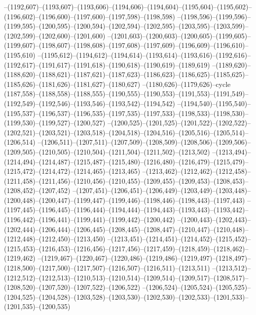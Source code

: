 --(1192,607)--(1193,607)--(1193,606)--(1194,606)--(1194,604)--(1195,604)--(1195,602)--(1196,602)--(1196,600)--(1197,600)--(1197,598)--(1198,598)
--(1198,596)--(1199,596)--(1199,595)--(1200,595)--(1200,594)--(1202,594)--(1202,595)--(1203,595)--(1203,599)--(1202,599)--(1202,600)--(1201,600)
--(1201,603)--(1200,603)--(1200,605)--(1199,605)--(1199,607)--(1198,607)--(1198,608)--(1197,608)--(1197,609)--(1196,609)--(1196,610)--(1195,610)
--(1195,612)--(1194,612)--(1194,614)--(1193,614)--(1193,616)--(1192,616)--(1192,617)--(1191,617)--(1191,618)--(1190,618)--(1190,619)--(1189,619)
--(1189,620)--(1188,620)--(1188,621)--(1187,621)--(1187,623)--(1186,623)--(1186,625)--(1185,625)--(1185,626)--(1181,626)--(1181,627)--(1180,627)
--(1180,626)--(1179,626)--cycle
(1187,558)--(1188,558)--(1188,555)--(1190,555)--(1190,553)--(1191,553)--(1191,549)--(1192,549)--(1192,546)--(1193,546)--(1193,542)--(1194,542)
--(1194,540)--(1195,540)--(1195,537)--(1196,537)--(1196,535)--(1197,535)--(1197,533)--(1198,533)--(1198,530)--(1199,530)--(1199,527)--(1200,527)
--(1200,525)--(1201,525)--(1201,522)--(1202,522)--(1202,521)--(1203,521)--(1203,518)--(1204,518)--(1204,516)--(1205,516)--(1205,514)--(1206,514)
--(1206,511)--(1207,511)--(1207,509)--(1208,509)--(1208,506)--(1209,506)--(1209,505)--(1210,505)--(1210,504)--(1211,504)--(1211,502)--(1213,502)
--(1213,494)--(1214,494)--(1214,487)--(1215,487)--(1215,480)--(1216,480)--(1216,479)--(1215,479)--(1215,472)--(1214,472)--(1214,465)--(1213,465)
--(1213,462)--(1212,462)--(1212,458)--(1211,458)--(1211,456)--(1210,456)--(1210,455)--(1209,455)--(1209,453)--(1208,453)--(1208,452)--(1207,452)
--(1207,451)--(1206,451)--(1206,449)--(1203,449)--(1203,448)--(1200,448)--(1200,447)--(1199,447)--(1199,446)--(1198,446)--(1198,443)--(1197,443)
--(1197,445)--(1196,445)--(1196,444)--(1194,444)--(1194,443)--(1193,443)--(1193,442)--(1196,442)--(1196,441)--(1199,441)--(1199,442)--(1200,442)
--(1200,443)--(1202,443)--(1202,444)--(1206,444)--(1206,445)--(1208,445)--(1208,447)--(1210,447)--(1210,448)--(1212,448)--(1212,450)--(1213,450)
--(1213,451)--(1214,451)--(1214,452)--(1215,452)--(1215,453)--(1216,453)--(1216,456)--(1217,456)--(1217,459)--(1218,459)--(1218,462)--(1219,462)
--(1219,467)--(1220,467)--(1220,486)--(1219,486)--(1219,497)--(1218,497)--(1218,500)--(1217,500)--(1217,507)--(1216,507)--(1216,511)--(1213,511)
--(1213,512)--(1212,512)--(1212,513)--(1210,513)--(1210,514)--(1209,514)--(1209,517)--(1208,517)--(1208,520)--(1207,520)--(1207,522)--(1206,522)
--(1206,524)--(1205,524)--(1205,525)--(1204,525)--(1204,528)--(1203,528)--(1203,530)--(1202,530)--(1202,533)--(1201,533)--(1201,535)--(1200,535)
